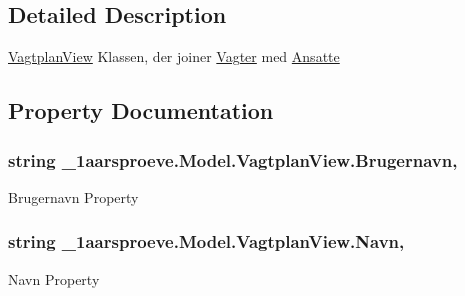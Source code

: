 \subsection{Detailed Description}
\hyperlink{class__1aarsproeve_1_1_model_1_1_vagtplan_view}{Vagtplan\+View} Klassen, der joiner \hyperlink{class__1aarsproeve_1_1_model_1_1_vagter}{Vagter} med \hyperlink{class__1aarsproeve_1_1_model_1_1_ansatte}{Ansatte} 



\subsection{Property Documentation}
\hypertarget{class__1aarsproeve_1_1_model_1_1_vagtplan_view_af46a732717fd9170a86a110b8fc5c5d3}{}
\subsubsection[{Brugernavn}]{\setlength{\rightskip}{0pt plus 5cm}string \+\_\+1aarsproeve.\+Model.\+Vagtplan\+View.\+Brugernavn\hspace{0.3cm}{\ttfamily [get]}, {\ttfamily [set]}}\label{class__1aarsproeve_1_1_model_1_1_vagtplan_view_af46a732717fd9170a86a110b8fc5c5d3}


Brugernavn Property 

\hypertarget{class__1aarsproeve_1_1_model_1_1_vagtplan_view_a3a99e8660e89591f8134cab170c73cb5}{}
\subsubsection[{Navn}]{\setlength{\rightskip}{0pt plus 5cm}string \+\_\+1aarsproeve.\+Model.\+Vagtplan\+View.\+Navn\hspace{0.3cm}{\ttfamily [get]}, {\ttfamily [set]}}\label{class__1aarsproeve_1_1_model_1_1_vagtplan_view_a3a99e8660e89591f8134cab170c73cb5}


Navn Property 

\hypertarget{class__1aarsproeve_1_1_model_1_1_vagtplan_view_a857981f9a44c61a751580ec5d6e72c7c}{}
